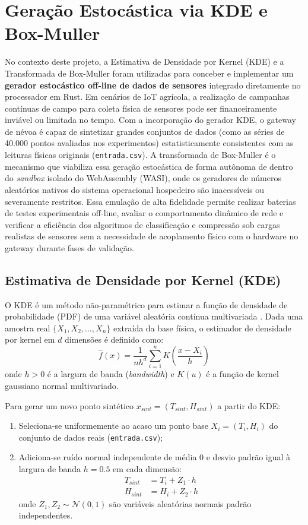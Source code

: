 \documentclass[
	12pt,
	openright,
	oneside,
	a4paper,
	english,
	brazil
	]{abntex2}
\begin{document}
\section{Geração Estocástica via KDE e Box-Muller}

No contexto deste projeto, a Estimativa de Densidade por Kernel (KDE) e a Transformada de Box-Muller foram utilizadas para conceber e implementar um \textbf{gerador estocástico off-line de dados de sensores} integrado diretamente no processador em Rust. Em cenários de IoT agrícola, a realização de campanhas contínuas de campo para coleta física de sensores pode ser financeiramente inviável ou limitada no tempo. Com a incorporação do gerador KDE, o gateway de névoa é capaz de sintetizar grandes conjuntos de dados (como as séries de 40.000 pontos avaliadas nos experimentos) estatisticamente consistentes com as leituras físicas originais (\texttt{entrada.csv}). A transformada de Box-Muller é o mecanismo que viabiliza essa geração estocástica de forma autônoma de dentro do \textit{sandbox} isolado do WebAssembly (WASI), onde os geradores de números aleatórios nativos do sistema operacional hospedeiro são inacessíveis ou severamente restritos. Essa emulação de alta fidelidade permite realizar baterias de testes experimentais off-line, avaliar o comportamento dinâmico de rede e verificar a eficiência dos algoritmos de classificação e compressão sob cargas realistas de sensores sem a necessidade de acoplamento físico com o hardware no gateway durante fases de validação.

\subsection{Estimativa de Densidade por Kernel (KDE)}

O KDE é um método não-paramétrico para estimar a função de densidade de probabilidade (PDF) de uma variável aleatória contínua multivariada \cite{silverman1986kde}. Dada uma amostra real $\{X_1, X_2, \dots, X_n\}$ extraída da base física, o estimador de densidade por kernel em $d$ dimensões é definido como:
\begin{equation}
\hat{f}(x) = \frac{1}{n h^d} \sum_{i=1}^n K\left(\frac{x - X_i}{h}\right)
\end{equation}
onde $h > 0$ é a largura de banda (\textit{bandwidth}) e $K(u)$ é a função de kernel gaussiano normal multivariado.

Para gerar um novo ponto sintético $x_{sint} = (T_{sint}, H_{sint})$ a partir do KDE:
\begin{enumerate}
    \item Seleciona-se uniformemente ao acaso um ponto base $X_i = (T_i, H_i)$ do conjunto de dados reais (\texttt{entrada.csv});
    \item Adiciona-se ruído normal independente de média $0$ e desvio padrão igual à largura de banda $h = 0.5$ em cada dimensão:
    \begin{align}
    T_{sint} &= T_i + Z_1 \cdot h \\
    H_{sint} &= H_i + Z_2 \cdot h
    \end{align}
    onde $Z_1, Z_2 \sim \mathcal{N}(0, 1)$ são variáveis aleatórias normais padrão independentes.
\end{enumerate}
\end{document}
